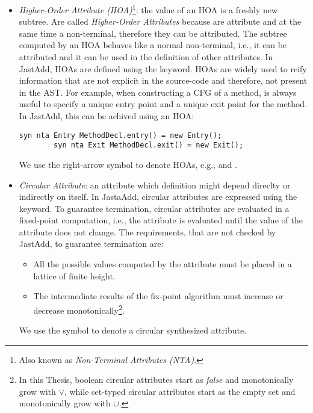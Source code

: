 \begin{itemize}
    \item \emph{Higher-Order Attribute (HOA)}\footnote{Also known as \emph{Non-Terminal Attributes (NTA)}.}:
    the value of an HOA is a freshly new subtree. Are called \emph{Higher-Order Attributes}
    because are attribute and at the same time a non-terminal, therefore they can be attributed.
    The subtree computed by an HOA behaves like a normal non-terminal, i.e., it can be
    attributed and it can be used in the definition of other attributes. In JastAdd, HOAs
    are defined using the  keyword. HOAs are widely used to reify information 
    that are not explicit in the source-code and therefore, not present in the AST.
    For example, when constructing a CFG of a method, is always useful to specify
    a unique entry point and a unique exit point for the method. In JastAdd, this can be
    achived using an HOA:
    \begin{lstlisting}[language=JastAdd]
        syn nta Entry MethodDecl.entry() = new Entry();
        syn nta Exit MethodDecl.exit() = new Exit();
    \end{lstlisting}
    We use the right-arrow symbol to denote HOAs, e.g.,   and .
    \item \emph{Circular Attribute}: an attribute which definition might depend direclty
    or indirectly on itself. In JastaAdd, circular attributes are expressed using the 
    keyword. To guarantee termination, circular attributes are evaluated in a fixed-point
    computation, i.e., the attribute is evaluated until the value of the attribute does not change.
    The requirements, that are not checked by JastAdd, to guarantee termination are:
    \begin{itemize}
        \item All the possible values computed by the attribute must be placed 
        in a lattice of finite height.
        \item The intermediate results of the fix-point algorithm must increase 
        or decrease monotonically\footnote{In this Thesis, boolean circular attributes start
        as \emph{false} and monotonically grow with $\vee$, while set-typed circular attributes
        start as the empty set and monotonically grow with $\cup$.}. 
    \end{itemize}
    We use the symbol  to denote a circular synthesized attribute.


\end{itemize}
